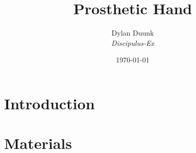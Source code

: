 \documentclass[a4paper]{article}
\title{\Huge{Prosthetic Hand} }
\author{Dylan Duunk \\ \textit{Discipulus-Ex} }
\date{\today}
\begin{document}
\begin{titlepage}
    \maketitle
\end{titlepage}


\newpage

\begin{abstract}
    \noindent 
    \lipsum[1]
\end{abstract}

\newpage
\tableofcontents
\newpage
{}

\section{Introduction}
\lipsum[1]

\section{Materials}
\end{document}
